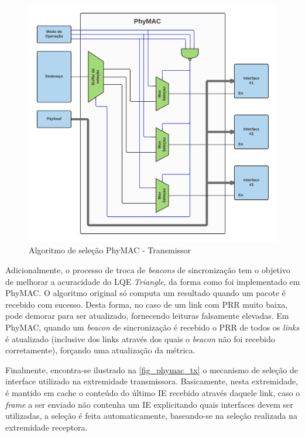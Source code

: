 \documentclass[
	12pt,				%
	openright,			%
	oneside,
	a4paper,			%
	english,			%
	french,				%
	spanish,			%
	brazil				%
	]{abntex2}
\begin{document}
\begin{figure}[htb]
	\centering
	\caption{Algoritmo de seleção PhyMAC - Transmissor}
	\label{fig_phymac_tx}
	\includegraphics[width=.99\linewidth]{PhyMAC_Seletor}
\end{figure}

Adicionalmente, o processo de troca de \textit{beacons} de sincronização tem o objetivo de melhorar a acuracidade do LQE \textit{Triangle}, da forma como foi implementado em PhyMAC. O algoritmo original só computa um resultado quando um pacote é recebido com sucesso. Desta forma, no caso de um link com PRR muito baixa, pode demorar para ser atualizado, fornecendo leituras falsamente elevadas. Em PhyMAC, quando um \textit{beacon} de sincronização é recebido o PRR de todos os \textit{links} é atualizado (inclusive dos links através dos quais o \textit{beacon} não foi recebido corretamente), forçando uma atualização da métrica.

Finalmente, encontra-se ilustrado na \autoref{fig_phymac_tx} o mecanismo de seleção de interface utilizado na extremidade transmissora. Basicamente, nesta extremidade, é mantido em cache o conteúdo do último IE recebido através daquele link, caso o \textit{frame} a ser enviado não contenha um IE explicitando quais interfaces devem ser utilizadas, a seleção é feita automaticamente, baseando-se na seleção realizada na extremidade receptora.
\end{document}
